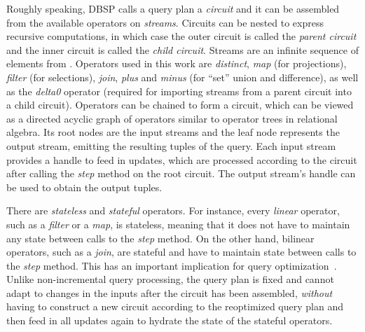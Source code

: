 Roughly speaking, DBSP calls a query plan a \emph{circuit}
and it can be assembled from the available operators on \emph{streams}.
Circuits can be nested to express recursive computations, in which case
the outer circuit is called the \emph{parent circuit} and the inner circuit
is called the \emph{child circuit}.
Streams are an infinite sequence of elements from \zsets{}.
Operators used in this work are \emph{distinct},
\emph{map} (for projections), \emph{filter} (for selections),
\emph{join}, \emph{plus} and \emph{minus} (for ``set'' union and difference),
as well as the \emph{delta0} operator (required for importing streams
from a parent circuit into a child circuit).
Operators can be chained to form a circuit, which can be viewed as
a directed acyclic graph of operators similar to operator trees in relational algebra.
Its root nodes are the input streams and the leaf node represents the output
stream, emitting the resulting tuples of the query.
Each input stream provides a handle to feed in updates, which are processed
according to the circuit after calling the \emph{step} method on the root
circuit.
The output stream's handle can be used to obtain the output tuples.

There are \emph{stateless} and \emph{stateful} operators.
For instance, every \emph{linear} operator, such as a \emph{filter} or a \emph{map},
is stateless, meaning that it does not have to maintain any state between
calls to the \emph{step} method.
On the other hand, bilinear operators, such as a \emph{join}, are stateful
and have to maintain state between calls to the \emph{step} method.
This has an important implication for query optimization~\cite{budiu2025dbsp}.
Unlike non-incremental query processing, the query plan is fixed and cannot
adapt to changes in the inputs after the circuit has been assembled,
\emph{without} having to construct a new circuit according to the
reoptimized query plan and then feed in all updates again to hydrate
the state of the stateful operators.
